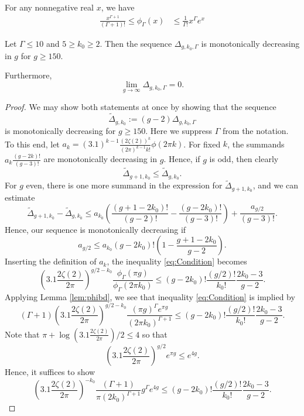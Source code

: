 \documentclass[10pt,a4paper]{amsart}
\renewcommand{\tilde}{\widetilde}
\begin{document}
\begin{lem} \label{lem:phibd}
For any nonnegative real $x$, we have
 \begin{align*}
    \frac{x^{\Gamma+1}}{(\Gamma+1)!} \leq \phi_\Gamma(x)&\leq \frac{1}{\Gamma!} x^\Gamma e^x 
\end{align*}   
\end{lem}

\begin{lem}\label{lem:Deltap mono}
    Let $\Gamma\leq 10$ and $5\geq k_0\geq 2$.
Then the sequence $\Delta_{g,k_0,\Gamma}$ is monotonically decreasing in $g$ for $g\geq 150$. 

Furthermore, 
\[
\lim_{g\to \infty} \Delta_{g,k_0,\Gamma}=0.
\]
\end{lem}

\begin{proof}
We may show both statements at once by showing that the sequence
\[
    \tilde\Delta_{g,k_0}:=(g-2)\Delta_{g,k_0,\Gamma}
\]
is monotonically decreasing for $g\geq 150$. Here we suppress $\Gamma$ from the notation.
To this end, let $a_k=(3.1)^{k-1}\frac{(2\zeta(2))^k }{(2\pi)^{k-1}k!}\phi(2\pi k)$. For fixed $k$, the summands $a_k \frac{(g-2k)!}{(g-3)!}$ are monotonically decreasing in $g$.
Hence, if $g$ is odd, then clearly 
\[
    \tilde\Delta_{g+1,k_0}\leq \tilde\Delta_{g,k_0}.
\]
For $g$ even, there is one more summand in the expression for $\tilde\Delta_{g+1,k_0}$, and we can estimate 
\[
    \tilde\Delta_{g+1,k_0}-\tilde\Delta_{g,k_0}
    \leq  a_{k_0}\left(\frac{(g+1-2k_0)!}{(g-2)!} -\frac{(g-2k_0)!}{(g-3)!}\right) + \frac{a_{g/2}}{(g-3)!}.
\]
Hence, our sequence is monotonically decreasing if 
\begin{equation}\label{eq:Condition}
    a_{g/2}
    \leq 
    a_{k_0}
    (g-2k_0)!\left(1-\frac{g+1-2k_0}{g-2}\right).
\end{equation}
Inserting the definition of $a_k$, the inequality \eqref{eq:Condition} becomes
\[
 \left(3.1\frac{2\zeta(2)}{2\pi}\right)^{g/2-k_0}
\frac{\phi_\Gamma(\pi g)}{\phi_\Gamma(2\pi k_0)}
\leq (g-2k_0)! \frac{(g/2)!}{k_0!}\frac{2k_0-3}{g-2}.
\]
Applying Lemma \ref{lem:phibd}, we see that
inequality \eqref{eq:Condition} is implied by 
\[
    (\Gamma+1) \left(3.1\frac{2\zeta(2)}{2\pi}\right)^{g/2-k_0}
    \frac{(\pi g)^\Gamma e^{\pi g}}{(2\pi k_0)^{\Gamma+1}}
    \leq (g-2k_0)! \frac{(g/2)!}{k_0!}\frac{2k_0-3}{g-2}.
\]
Note that $\pi+\log(3.1\frac{2\zeta(2)}{2\pi})/2\leq 4$ so that
\[
    \left(3.1\frac{2\zeta(2)}{2\pi}\right)^{g/2}e^{\pi g} \leq e^{4g}.
\]
Hence, it suffices to show
\[
    \left(3.1\frac{2\zeta(2)}{2\pi}\right)^{-k_0} \frac{(\Gamma+1)}{\pi(2 k_0)^{\Gamma+1}}
    g^\Gamma e^{4 g}
    \leq (g-2k_0)! \frac{(g/2)!}{k_0!}\frac{2k_0-3}{g-2}.
\]


\end{proof}
\end{document}
